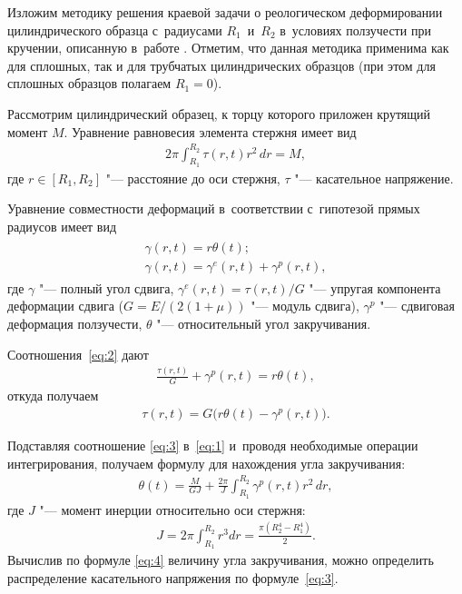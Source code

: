 \smallskip

Изложим методику решения краевой задачи о реологическом деформировании цилиндрического образца с~радиусами $R_1$~и~$R_2$ в~условиях ползучести при кручении, описанную в~работе \cite{RadTsv13}. 
Отметим, что данная методика применима как для сплошных, так и для трубчатых цилиндрических образцов (при этом для сплошных образцов полагаем $R_1=0$).

Рассмотрим цилиндрический образец, к торцу которого приложен крутящий момент $M$. 
Уравнение равновесия элемента стержня имеет вид
\begin{gather} \label{eq:1}
    2\pi \int_{R_1}^{R_2} \tau(r,t) r^2 \,dr = M,
\end{gather}
где $r\in [R_1, R_2 ]$ "--- расстояние до оси стержня, $\tau$ "--- касательное напряжение.

Уравнение совместности деформаций в~соответствии с~гипотезой прямых радиусов имеет вид
\begin{align} \label{eq:2}
\begin{array}{l}
    \gamma(r,t) = r \theta(t);	\\
    \gamma(r,t) = \gamma^e(r,t) + \gamma^p(r,t),
\end{array}
\end{align}
где $\gamma$ "--- полный угол сдвига, $\gamma^e(r,t) = \tau(r,t) / G$ "--- упругая компонента деформации сдвига ($G = E / \left(2 (1 + \mu) \right)$ "--- модуль сдвига), $\gamma^p$ "--- сдвиговая деформация ползучести, $\theta$ "--- относительный угол закручивания.

Соотношения~\eqref{eq:2} дают
\begin{gather*}
    \frac{\tau(r,t)}{G} + \gamma^p(r,t) = r \theta(t),
\end{gather*}
откуда получаем
\begin{gather} \label{eq:3}
    \tau(r,t) = G \bigl( r \theta(t) - \gamma^p(r,t) \bigr).
\end{gather}

Подставляя соотношение \eqref{eq:3} в~\eqref{eq:1} и~проводя необходимые операции интегрирования, получаем формулу для нахождения угла закручивания:
\begin{gather} \label{eq:4}
    \theta(t) = \frac{M}{GJ} + \frac{2\pi}{J} \int_{R_1}^{R_2} \gamma^p(r,t) r^2 \, dr,
\end{gather}
где $J$ "--- момент инерции относительно оси стержня:
\begin{gather*}
	J = 2\pi \int_{R_1}^{R_2}r^3 dr = \frac{\pi (R_2^4-R_1^4)}{2}.
\end{gather*}
Вычислив по формуле \eqref{eq:4} величину угла закручивания, можно определить распределение касательного напряжения по формуле~\eqref{eq:3}.

